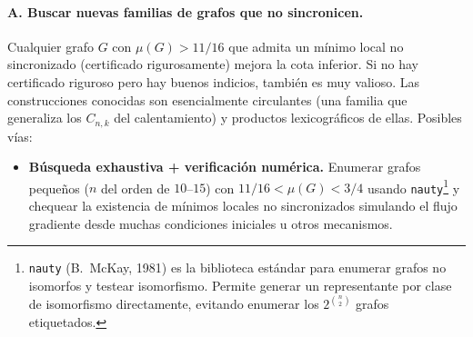 \documentclass[11pt,a4paper]{article}
\begin{document}
\paragraph{A. Buscar nuevas familias de grafos que no sincronicen.}
Cualquier grafo $G$ con $\mu(G) > 11/16$ que admita un mínimo local no sincronizado (certificado rigurosamente) mejora la cota inferior. Si no hay certificado riguroso pero hay buenos indicios, también es muy valioso. Las construcciones conocidas son esencialmente circulantes (una familia que generaliza los $C_{n,k}$ del calentamiento) y productos lexicográficos de ellas. Posibles vías:
\begin{itemize}
    \item \textbf{Búsqueda exhaustiva + verificación numérica.} Enumerar grafos pequeños ($n$ del orden de $10$--$15$) con $11/16 < \mu(G) < 3/4$ usando \texttt{nauty}\footnote{\texttt{nauty} (B.~McKay, 1981) es la biblioteca estándar para enumerar grafos no isomorfos y testear isomorfismo. Permite generar un representante por clase de isomorfismo directamente, evitando enumerar los $2^{\binom{n}{2}}$ grafos etiquetados.} y chequear la existencia de mínimos locales no sincronizados simulando el flujo gradiente desde muchas condiciones iniciales u otros mecanismos.


\end{itemize}
\end{document}
